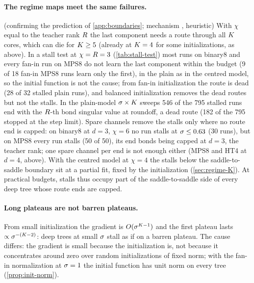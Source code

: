 \paragraph{The regime maps meet the same failures.}\label{sec:s2s-stalls-maps}
\empirical{} (confirming the prediction of \cref{app:boundaries}; mechanism \conjecture, heuristic) With $\chi$
equal to the teacher rank $R$ the last component needs a route through all $K$ cores, which can die for
$K\ge5$ (already at $K=4$ for some initializations, as above). In a stall test at $\chi=R=3$
(\cref{tab:stall-test}) most runs on binary8 and every fan-in run on MPS8 do not learn the last component within
the budget (9 of 18 fan-in MPS8 runs learn only the first), in the plain as in the centred model, so the initial
function is not the cause; from fan-in initialization the route is dead (28 of 32 stalled plain runs), and balanced
initialization removes the dead routes but not the stalls. In the plain-model $\sigma\times K$ sweeps 546 of the 795
stalled runs end with the $R$-th bond singular value at roundoff, a dead route (182 of the 795 stopped at the
step limit). Spare channels remove the
stalls only where no route end is capped: on binary8 at $d=3$, $\chi=6$ no run stalls at $\sigma\le0.63$ (30 runs),
but on MPS8 every run stalls (50 of 50), its end bonds being capped at $d=3$, the teacher rank; one spare channel per
end is not enough either (MPS8 and HT4 at $d=4$, above). With the centred model at $\chi=4$ the stalls below the
saddle-to-saddle boundary sit at a partial fit, fixed by the initialization (\cref{sec:regime-K}). At practical
budgets, stalls thus occupy part of the saddle-to-saddle side of every deep tree whose route ends are capped.

\paragraph{Long plateaus are not barren plateaus.}\label{sec:s2s-barren}
\derived{} From small initialization the gradient is $O(\sigma^{K-1})$ and the first plateau lasts
$\propto\sigma^{-(K-2)}$: deep trees at small $\sigma$ stall as if on a barren plateau. The cause differs: the gradient
is small because the initialization is, not because it concentrates around zero over random initializations of
fixed norm; with the fan-in normalization at $\sigma=1$ the initial function has unit norm on every tree
(\cref{prop:init-norm}). 

